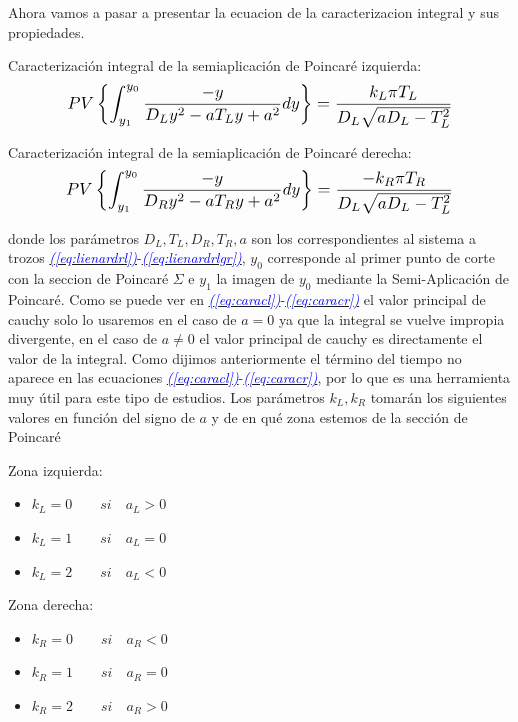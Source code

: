 \documentclass[12pt,a4paper]{report} %
\newcommand{\eref}[1]{\hyperref[#1]{\textcolor{blue}{\textit{(\ref*{#1})}}}}
\begin{document}
	\vspace{0.5cm}\noindent Ahora vamos a pasar a presentar la ecuacion de la caracterizacion integral y sus propiedades.
	
	\vspace{0.5cm}\noindent Caracterización integral de la semiaplicación de Poincaré izquierda:
	\begin{equation}
		\label{eq:caracl}
		\scalebox{1.2}{$\displaystyle
		PV\left\{\int_{y_1}^{y_0}\frac{-y}{D_Ly^2-aT_Ly+a^2}dy\right\}=\frac{k_L\pi T_L}{D_L\sqrt{aD_L-T_L^2}}
		$}
	\end{equation}\smallskip
	
	\vspace{0.5cm}\noindent Caracterización integral de la semiaplicación de Poincaré derecha:
	\begin{equation}
		\label{eq:caracr}
		\scalebox{1.2}{$\displaystyle
			PV\left\{\int_{y_1}^{y_0}\frac{-y}{D_Ry^2-aT_Ry+a^2}dy\right\}=\frac{-k_R\pi T_R}{D_L\sqrt{aD_L-T_L^2}}
			$}
	\end{equation}\smallskip
	
	\noindent donde los parámetros $D_L,T_L,D_R,T_R,a$ son los correspondientes al sistema a trozos \eref{eq:lienardrl}-\eref{eq:lienardrlgr}, $y_0$ corresponde al primer punto de corte con la seccion de Poincaré $\varSigma$ e $y_1$ la imagen de $y_0$ mediante la Semi-Aplicación de Poincaré. Como se puede ver en \eref{eq:caracl}-\eref{eq:caracr} el valor principal de cauchy solo lo usaremos en el caso de $a=0$ ya que la integral se vuelve impropia divergente, en el caso de $a\neq0$ el valor principal de cauchy es directamente el valor de la integral. Como dijimos anteriormente el término del tiempo no aparece en las ecuaciones \eref{eq:caracl}-\eref{eq:caracr}, por lo que es una herramienta muy útil para este tipo de estudios. Los parámetros $k_L,k_R$ tomarán los siguientes valores en función del signo de $a$ y de en qué zona estemos de la sección de Poincaré
	
	\vspace{0.5cm}\noindent Zona izquierda:
	\begin{itemize}
		\item $k_L=0 \qquad si \quad a_L>0$
		\item $k_L=1 \qquad si \quad a_L=0$
		\item $k_L=2 \qquad si \quad a_L<0$
	\end{itemize}\smallskip
	
		\noindent Zona derecha:
	\begin{itemize}
		\item $k_R=0 \qquad si \quad a_R<0$
		\item $k_R=1 \qquad si \quad a_R=0$
		\item $k_R=2 \qquad si \quad a_R>0$
	\end{itemize}\smallskip
	\newpage
	
\end{document}
